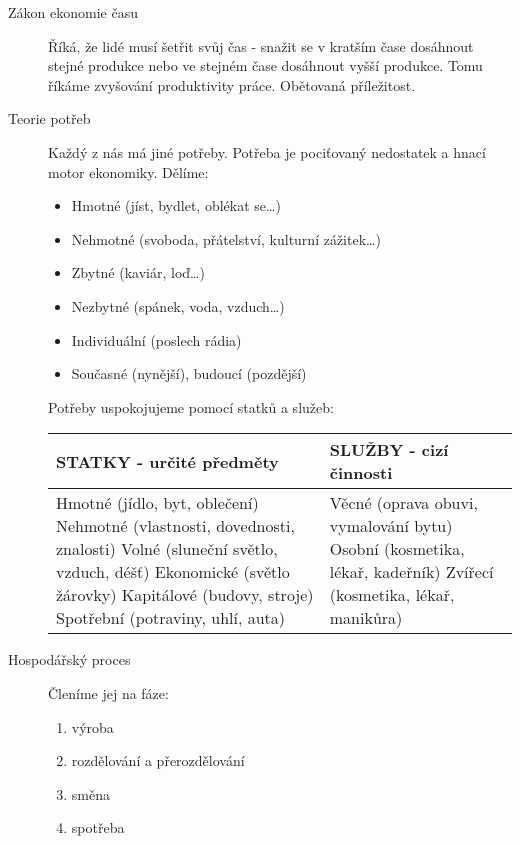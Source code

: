 \begin{description}
    \item[Zákon ekonomie času] Říká, že lidé musí šetřit svůj čas - snažit se v kratším čase dosáhnout stejné produkce nebo ve stejném
    čase dosáhnout vyšší produkce. Tomu říkáme zvyšování produktivity práce. Obětovaná příležitost.
    \item[Teorie potřeb] Každý z nás má jiné potřeby. Potřeba je pociťovaný nedostatek a hnací motor ekonomiky. Dělíme:
    \begin{itemize}
        \item Hmotné (jíst, bydlet, oblékat se\ldots)
        \item Nehmotné (svoboda, přátelství, kulturní zážitek\ldots)
        \item Zbytné (kaviár, loď\ldots)
        \item Nezbytné (spánek, voda, vzduch\ldots)
        \item Individuální (poslech rádia)
        \item Současné (nynější), budoucí (pozdější)
    \end{itemize}
    Potřeby uspokojujeme pomocí statků a služeb:
    
    \begin{tabular}{| p{8cm} | p{8cm} |}
        \hline
        \textbf{STATKY - určité předměty} & \textbf{SLUŽBY - cizí činnosti} \\
        \hline
        Hmotné (jídlo, byt, oblečení) \newline Nehmotné (vlastnosti, dovednosti, znalosti) \newline Volné (sluneční světlo, vzduch, déšť) \newline Ekonomické (světlo žárovky) \newline Kapitálové (budovy, stroje) \newline Spotřební (potraviny, uhlí, auta) & Věcné (oprava obuvi, vymalování bytu) \newline Osobní (kosmetika, lékař, kadeřník) \newline Zvířecí (kosmetika, lékař, manikůra) \\
        \hline
    \end{tabular}
    \item[Hospodářský proces] Členíme jej na fáze:
    \begin{enumerate}
        \item výroba
        \item rozdělování a přerozdělování
        \item směna
        \item spotřeba
    \end{enumerate}
    

\end{description}
